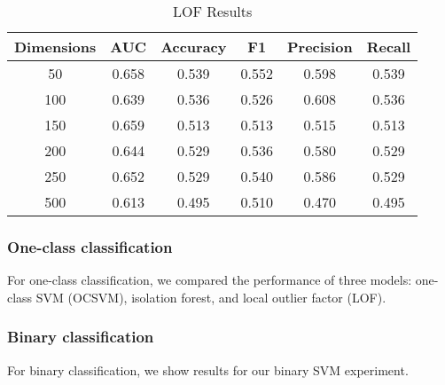 \documentclass{article}
\begin{document}
\begin{table}
 \caption{LOF Results}
  \centering
  \begin{tabular}{|c|c|c|c|c|c|}
    \hline
    \rowcolor{lightgray} \textbf{Dimensions} & \textbf{AUC} & \textbf{Accuracy} & \textbf{F1} & \textbf{Precision} & \textbf{Recall} \\
    \hline
    \cellcolor{green} 50 & 0.658 & \cellcolor{green} 0.539 & \cellcolor{green} 0.552 & 0.598 & \cellcolor{green} 0.539 \\
    \hline
    100 & 0.639 & 0.536 & 0.526 & \cellcolor{green} 0.608 & 0.536 \\
    \hline
    150 & \cellcolor{green} 0.659 & 0.513 & 0.513 & 0.515 & 0.513 \\
    \hline
    200 & 0.644 & 0.529 & 0.536 & 0.580 & 0.529 \\
    \hline
    250 & 0.652 & 0.529 & 0.540 & 0.586 & 0.529 \\
    \hline
    500 & 0.613 & 0.495 & 0.510 & 0.470 & 0.495 \\
    \hline
  \end{tabular}
  \label{tab:lof}
\end{table}

\hypertarget{one-class-classification}{%
\subsubsection{One-class
classification}\label{one-class-classification}}

For one-class classification, we compared the performance of three
models: one-class SVM (OCSVM), isolation forest, and local outlier
factor (LOF).

\hypertarget{binary-classification}{%
\subsubsection{Binary classification}\label{binary-classification}}

For binary classification, we show results for our binary SVM
experiment.
\end{document}
